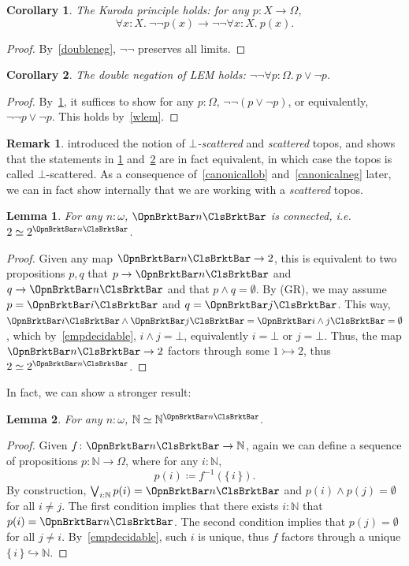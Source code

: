 \documentclass[a4paper,10pt]{amsart}
\newtheorem{lemma}{Lemma}[section]
\newtheorem{corollary}{Corollary}[section]
\theoremstyle{definition}
\newtheorem{remark}{Remark}[section]
\newcommand{\mbb}[1]{\mathbb{#1}}
\newcommand{\inv}{^{\mathrm{-1}}}
\newcommand{\set}[1]{\{\,#1\,\}}
\newcommand{\inj}{\rightarrowtail}
\newcommand{\hook}{\hookrightarrow}
\newcommand{\N}{\mbb N}
\newcommand{\fa}[2]{\forall #1 \!:\! #2.\ }
\newcommand{\emp}{\emptyset}
\newcommand{\ass}[1]{\OpnBrktBar#1\ClsBrktBar}
\newcommand{\Prop}{\Omega}
\begin{document}
\begin{corollary}\label{Kuroda}
  The Kuroda principle holds: for any $p \colon X \to \Prop$, 
  \[ \fa xX \neg\neg p(x) \to \neg\neg \fa xX p(x). \]
\end{corollary}
\begin{proof}
  By~\cref{doubleneg}, $\neg\neg$ preserves all limits.
\end{proof}

\begin{corollary}\label{negnegBoo}
  The double negation of LEM holds: $\neg\neg\fa p{\Prop}p \vee \neg p$.
\end{corollary}
\begin{proof}
  By~\cref{Kuroda}, it suffices to show for any $p:\Prop$, $\neg\neg(p \vee \neg p)$, or equivalently, $\neg\neg p \vee \neg p$. This holds by~\cref{wlem}.
\end{proof}

\begin{remark}\label{scatterlogic}
  \cite{ESAKIA200097} introduced the notion of \emph{$\bot$-scattered} and \emph{scattered} topos, and shows that the statements in \cref{Kuroda} and~\cref{negnegBoo} are in fact equivalent, in which case the topos is called $\bot$-scattered. As a consequence of~\cref{canonicallob} and~\cref{canonicalneg} later, we can in fact show internally that we are working with a \emph{scattered} topos.
\end{remark}

\begin{lemma}\label{internallyconnected}
  For any $n:\omega$, $\ass n$ is connected, i.e. $2 \simeq 2^{\ass n}$. 
\end{lemma}
\begin{proof}
  Given any map $\ass n \to 2$, this is equivalent to two propositions $p,q$ that $p \to \ass n$ and $q \to \ass n$ and that $p \wedge q = \emp$. By (GR), we may assume $p = \ass i$ and $q = \ass j$. This way, $\ass i \wedge \ass j = \ass{i \wedge j} = \emp$, which by~\cref{empdecidable}, $i \wedge j = \bot$, equivalently $i = \bot$ or $j = \bot$. Thus, the map $\ass n \to 2$ factors through some $1 \inj 2$, thus $2 \simeq 2^{\ass n}$.
\end{proof}

In fact, we can show a stronger result:

\begin{lemma}\label{interallyconconnected}
  For any $n:\omega$, $\N \simeq \N^{\ass n}$.
\end{lemma}
\begin{proof}
  Given $f \colon \ass n \to \N$, again we can define a sequence of propositions $p \colon \N \to \Prop$, where for any $i:\N$,
  \[ p(i) \coloneq f\inv(\set{i}). \]
  By construction, $\bigvee_{i:\N}p(i) = \ass n$ and $p(i) \wedge p(j) = \emp$ for all $i \neq j$. The first condition implies that there exists $i:\N$ that $p(i) = \ass n$. The second condition implies that $p(j) = \emp$ for all $j \neq i$. By~\cref{empdecidable}, such $i$ is unique, thus $f$ factors through a unique $\set i \hook \N$.
\end{proof}
\end{document}

